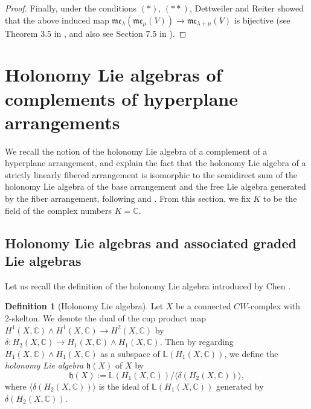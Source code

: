 \documentclass[a4paper,12pt]{article}
\theoremstyle{definition}
\newtheorem{df}[thm]{Definition}
\theoremstyle{remark}
\begin{document}
\begin{proof}
Finally, under the conditions $(*),\,(**)$, Dettweiler and Reiter showed that the above induced map
$\mathfrak{mc}_{\lambda}(\mathfrak{mc}_{\mu}(V)) \to \mathfrak{mc}_{\lambda+\mu}(V)$
is bijective (see Theorem 3.5 
in \cite{DR00}, and also see Section 7.5 in \cite{Harbook}).
\end{proof}

\section{Holonomy Lie algebras of complements of hyperplane arrangements}\label{sec:holonomy}
We recall the notion of the holonomy Lie algebra of a complement of a hyperplane arrangement, and explain
the fact that the holonomy Lie algebra of 
a strictly linearly fibered arrangement is isomorphic to the semidirect sum of the holonomy Lie algebra of the base arrangement and the free Lie algebra generated by the fiber arrangement,
following \cite{Koh83} and \cite{CCX03}.
From this section, we fix $K$ to be the field of the complex numbers $K=\mathbb{C}$.
\subsection{Holonomy Lie algebras and associated graded Lie algebras}
Let us recall the definition of the holonomy Lie algebra introduced by Chen \cite{Ch73}.
\begin{df}[Holonomy Lie algebra]
	Let $X$ be a connected $CW$-complex with 2-skelton. 
	We denote the dual of the cup product map $H^{1}(X,\mathbb{C})\wedge H^{1}(X,\mathbb{C})\to H^{2}(X,\mathbb{C})$ by 
	$\delta\colon H_{2}(X,\mathbb{C})\to H_{1}(X,\mathbb{C})\wedge H_{1}(X,\mathbb{C})$.
	Then by regarding $H_{1}(X,\mathbb{C})\wedge H_{1}(X,\mathbb{C})$ as a subspace of $\mathbb{L}(H_{1}(X,\mathbb{C}))$, we define the \emph{holonomy Lie algebra} $\mathfrak{h}(X)$ of $X$ by
	\[
	\mathfrak{h}(X) := \mathbb{L}(H_{1}(X,\mathbb{C}))/\langle \delta(H_{2}(X,\mathbb{C})) \rangle,
	\]
	where $\langle \delta(H_{2}(X,\mathbb{C})) \rangle$ is the ideal of $\mathbb{L}(H_{1}(X,\mathbb{C}))$ generated by $\delta(H_{2}(X,\mathbb{C}))$.
\end{df}
\end{document}
